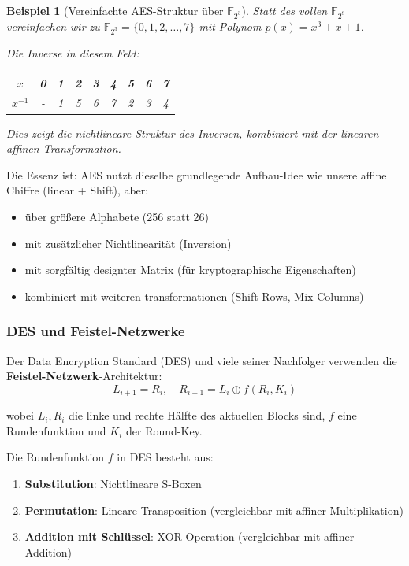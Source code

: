 ﻿\documentclass[12pt,a4paper]{article}
\newtheorem{example}{Beispiel}
\begin{document}
	\begin{example}[Vereinfachte AES-Struktur über $\mathbb{F}_{2^3}$]
		Statt des vollen $\mathbb{F}_{2^8}$ vereinfachen wir zu $\mathbb{F}_{2^3} = \{0,1,2,\ldots,7\}$ mit Polynom $p(x) = x^3 + x + 1$.
		
		Die Inverse in diesem Feld:
		\begin{center}
			\small
			\begin{tabular}{|c|c|c|c|c|c|c|c|c|}
				\hline
				$x$ & 0 & 1 & 2 & 3 & 4 & 5 & 6 & 7 \\
				\hline
				$x^{-1}$ & - & 1 & 5 & 6 & 7 & 2 & 3 & 4 \\
				\hline
			\end{tabular}
		\end{center}
		
		Dies zeigt die nichtlineare Struktur des Inversen, kombiniert mit der linearen affinen Transformation.
	\end{example}
	
	Die Essenz ist: AES nutzt dieselbe grundlegende Aufbau-Idee wie unsere affine Chiffre (linear + Shift), aber:
	\begin{itemize}
		\item über größere Alphabete (256 statt 26)
		\item mit zusätzlicher Nichtlinearität (Inversion)
		\item mit sorgfältig designter Matrix (für kryptographische Eigenschaften)
		\item kombiniert mit weiteren transformationen (Shift Rows, Mix Columns)
	\end{itemize}
	
	\subsubsection{DES und Feistel-Netzwerke}
	
	Der Data Encryption Standard (DES) und viele seiner Nachfolger verwenden die \textbf{Feistel-Netzwerk}-Architektur:
	\begin{equation}
		L_{i+1} = R_i, \quad R_{i+1} = L_i \oplus f(R_i, K_i)
	\end{equation}
	
	wobei $L_i, R_i$ die linke und rechte Hälfte des aktuellen Blocks sind, $f$ eine Rundenfunktion und $K_i$ der Round-Key.
	
	Die Rundenfunktion $f$ in DES besteht aus:
	\begin{enumerate}
		\item \textbf{Substitution}: Nichtlineare S-Boxen
		\item \textbf{Permutation}: Lineare Transposition (vergleichbar mit affiner Multiplikation)
		\item \textbf{Addition mit Schlüssel}: XOR-Operation (vergleichbar mit affiner Addition)
	\end{enumerate}
	
\end{document}
